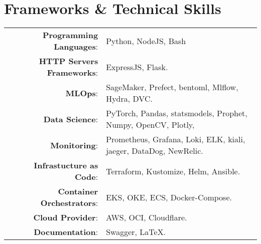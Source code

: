 \documentclass[a4paper,10pt]{article}
\begin{document}
\section{\textbf{Frameworks \& Technical Skills}}

\begin{longtable}{r p{16cm}}	
    \textbf{Programming Languages}:& Python, NodeJS, Bash\\
    \textbf{HTTP Servers Frameworks}:& ExpressJS, Flask.\\
    \textbf{MLOps}:& SageMaker, Prefect, bentoml, Mlflow, Hydra, DVC.\\
    \textbf{Data Science}:& PyTorch, Pandas, statsmodels, Prophet, Numpy, OpenCV, Plotly,\\
    \textbf{Monitoring}:& Prometheus, Grafana, Loki, ELK, kiali, jaeger, DataDog, NewRelic.\\ 
    \textbf{Infrastucture as Code}:& Terraform, Kustomize, Helm, Ansible.\\
    \textbf{Container Orchestrators}:& EKS, OKE, ECS, Docker-Compose. \\
    \textbf{Cloud Provider}:& AWS, OCI, Cloudflare. \\
    \textbf{Documentation}:& Swagger, \LaTeX.\\
\end{longtable}
\label{LastPage}
\end{document}
